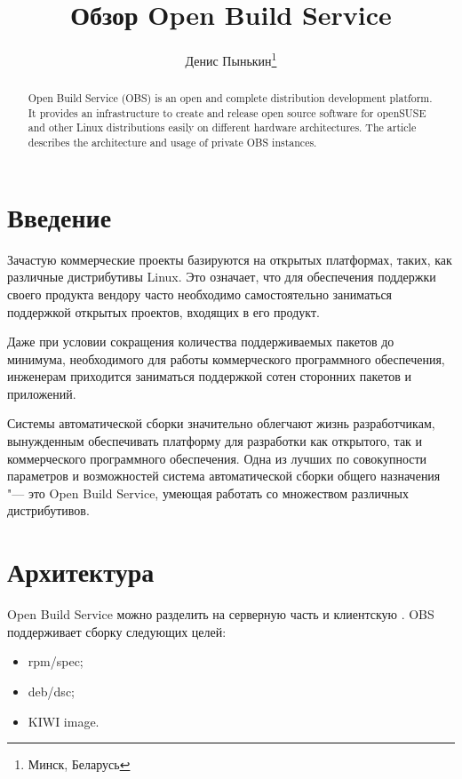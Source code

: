 \documentclass[10pt, a5paper]{article}
\begin{document}
\title{Обзор Open Build Service}%

\author{Денис Пынькин\footnote{Минск, Беларусь}}
\maketitle

\begin{abstract}
Open Build Service (OBS) is an open and complete distribution development platform. It provides an infrastructure to create and release open source software for openSUSE and other Linux distributions easily on different hardware architectures. The article describes the architecture and usage of private OBS instances.
\end{abstract}

\section*{Введение}

Зачастую коммерческие проекты базируются на открытых платформах, таких, как различные дистрибутивы Linux. Это означает, что для обеспечения поддержки своего продукта  вендору часто необходимо самостоятельно заниматься поддержкой открытых проектов, входящих в его продукт.

Даже при условии сокращения количества поддерживаемых пакетов до минимума,  необходимого для работы коммерческого программного обеспечения, инженерам приходится заниматься поддержкой сотен сторонних пакетов и приложений.

Системы автоматической сборки значительно облегчают жизнь разработчикам, вынужденным обеспечивать платформу для разработки как открытого,  так и коммерческого программного обеспечения. Одна из лучших по совокупности параметров и возможностей система автоматической сборки общего назначения "--- это Open Build Service, умеющая работать со множеством различных дистрибутивов.

\section*{Архитектура}

Open Build Service можно разделить на серверную часть и клиентскую \cite{Pynkin1}.
OBS поддерживает сборку следующих целей:

\begin{itemize}
  \item rpm/spec;
  \item deb/dsc;
  \item KIWI image.
\end{itemize}
\end{document}
